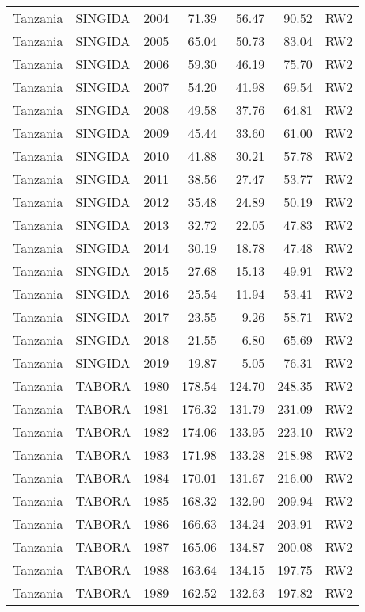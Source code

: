 \begin{longtable}{lllrrrl}
  Tanzania & SINGIDA & 2004 & 71.39 & 56.47 & 90.52 & RW2 \\ 
  Tanzania & SINGIDA & 2005 & 65.04 & 50.73 & 83.04 & RW2 \\ 
  Tanzania & SINGIDA & 2006 & 59.30 & 46.19 & 75.70 & RW2 \\ 
  Tanzania & SINGIDA & 2007 & 54.20 & 41.98 & 69.54 & RW2 \\ 
  Tanzania & SINGIDA & 2008 & 49.58 & 37.76 & 64.81 & RW2 \\ 
  Tanzania & SINGIDA & 2009 & 45.44 & 33.60 & 61.00 & RW2 \\ 
  Tanzania & SINGIDA & 2010 & 41.88 & 30.21 & 57.78 & RW2 \\ 
  Tanzania & SINGIDA & 2011 & 38.56 & 27.47 & 53.77 & RW2 \\ 
  Tanzania & SINGIDA & 2012 & 35.48 & 24.89 & 50.19 & RW2 \\ 
  Tanzania & SINGIDA & 2013 & 32.72 & 22.05 & 47.83 & RW2 \\ 
  Tanzania & SINGIDA & 2014 & 30.19 & 18.78 & 47.48 & RW2 \\ 
  Tanzania & SINGIDA & 2015 & 27.68 & 15.13 & 49.91 & RW2 \\ 
  Tanzania & SINGIDA & 2016 & 25.54 & 11.94 & 53.41 & RW2 \\ 
  Tanzania & SINGIDA & 2017 & 23.55 & 9.26 & 58.71 & RW2 \\ 
  Tanzania & SINGIDA & 2018 & 21.55 & 6.80 & 65.69 & RW2 \\ 
  Tanzania & SINGIDA & 2019 & 19.87 & 5.05 & 76.31 & RW2 \\ 
  Tanzania & TABORA & 1980 & 178.54 & 124.70 & 248.35 & RW2 \\ 
  Tanzania & TABORA & 1981 & 176.32 & 131.79 & 231.09 & RW2 \\ 
  Tanzania & TABORA & 1982 & 174.06 & 133.95 & 223.10 & RW2 \\ 
  Tanzania & TABORA & 1983 & 171.98 & 133.28 & 218.98 & RW2 \\ 
  Tanzania & TABORA & 1984 & 170.01 & 131.67 & 216.00 & RW2 \\ 
  Tanzania & TABORA & 1985 & 168.32 & 132.90 & 209.94 & RW2 \\ 
  Tanzania & TABORA & 1986 & 166.63 & 134.24 & 203.91 & RW2 \\ 
  Tanzania & TABORA & 1987 & 165.06 & 134.87 & 200.08 & RW2 \\ 
  Tanzania & TABORA & 1988 & 163.64 & 134.15 & 197.75 & RW2 \\ 
  Tanzania & TABORA & 1989 & 162.52 & 132.63 & 197.82 & RW2 \\ 

\end{longtable}
